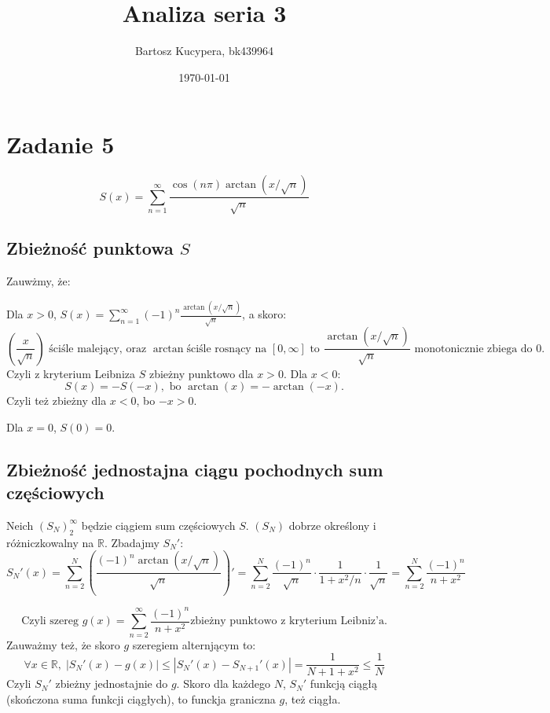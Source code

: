 \documentclass{article}
\title{Analiza seria 3}
\author{Bartosz Kucypera, bk439964}
\date{\today}
\begin{document}
\maketitle

\section*{Zadanie 5}
$$S(x) = \displaystyle \sum_{n=1}^{\infty}\frac{\cos(n\pi)\arctan(x/ \sqrt{n})}{\sqrt{n}} $$

\subsection*{Zbieżność punktowa $S$}
Zauwżmy, że: \newline 

Dla $x > 0$, $S(x) = \sum_{n=1}^{\infty} (-1)^n \frac{\arctan(x /\sqrt{n})}{\sqrt{n}}$, a skoro:
$$\left( \frac{x}{\sqrt{n} }\right) \mbox{ ściśle malejący, oraz } \arctan  \mbox{ściśle rosnący na } [0,\infty] \mbox{ to } \frac{\arctan(x /\sqrt{n})}{\sqrt{n}} \mbox{ monotonicznie zbiega do } 0.$$
Czyli z kryterium Leibniza $S$ zbieżny punktowo dla $x > 0$. \newline
Dla $x < 0$:
$$S(x) = -S(-x), \mbox{ bo } \arctan(x) = -\arctan(-x). $$
Czyli też zbieżny dla $x < 0$, bo $-x > 0$.

Dla $x = 0$, $S(0) = 0$.

\subsection*{Zbieżność jednostajna ciągu pochodnych sum częściowych}

Neich $(S_N)_{2}^{\infty}$ będzie ciągiem sum częściowych $S$.
$(S_N)$ dobrze określony i różniczkowalny na $\mathbb{R}$. \newline
Zbadajmy $S_N'$:
$$ S_N'(x) = \sum_{n=2}^{N} \left( \frac{(-1)^n \arctan(x/ \sqrt{n})}{\sqrt{n}} \right)' =
\sum_{n=2}^{N} \frac{(-1)^n}{\sqrt{n}} \cdot \frac{1}{1 + x^2 /n} \cdot \frac{1}{\sqrt{n}} =
\sum_{n=2}^{N} \frac{(-1)^n}{n+x^2}$$

$$\mbox{Czyli szereg } g(x) = \sum_{n=2}^{\infty}\frac{(-1)^n}{n+x^2} \mbox{zbieżny punktowo z kryterium Leibniz'a.}$$
Zauważmy też, że skoro $g$ szeregiem alternjącym to: 
$$\forall x \in \mathbb{R}, \;|S_N'(x) - g(x)| \le |S_N'(x)-S_{N+1}'(x)| = \frac{1}{N+1+x^2} \le \frac{1}{N}$$
Czyli $S_N'$ zbieżny jednostajnie do $g$. Skoro dla każdego $N$, $S_N'$ funkcją ciągłą (skończona suma funkcji ciągłych), to funckja graniczna $g$, też ciągła.
\end{document}

